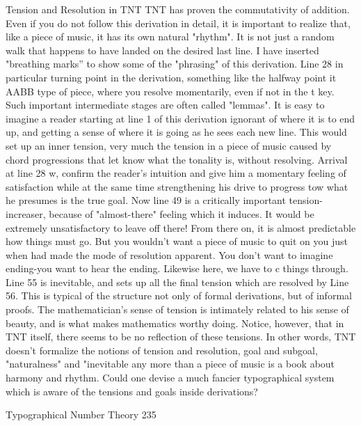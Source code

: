                           Tension and Resolution in TNT
TNT has proven the commutativity of addition. Even if you do not follow this derivation
in detail, it is important to realize that, like a piece of music, it has its own natural
"rhythm". It is not just a random walk that happens to have landed on the desired last
line. I have inserted "breathing marks” to show some of the "phrasing" of this derivation.
Line 28 in particular turning point in the derivation, something like the halfway point it
AABB type of piece, where you resolve momentarily, even if not in the t key. Such
important intermediate stages are often called "lemmas".
         It is easy to imagine a reader starting at line 1 of this derivation ignorant of where
it is to end up, and getting a sense of where it is going as he sees each new line. This
would set up an inner tension, very much the tension in a piece of music caused by chord
progressions that let know what the tonality is, without resolving. Arrival at line 28 w,
confirm the reader's intuition and give him a momentary feeling of satisfaction while at
the same time strengthening his drive to progress tow what he presumes is the true goal.
         Now line 49 is a critically important tension-increaser, because of "almost-there"
feeling which it induces. It would be extremely unsatisfactory to leave off there! From
there on, it is almost predictable how things must go. But you wouldn't want a piece of
music to quit on you just when had made the mode of resolution apparent. You don't
want to imagine ending-you want to hear the ending. Likewise here, we have to c things
through. Line 55 is inevitable, and sets up all the final tension which are resolved by Line
56.
         This is typical of the structure not only of formal derivations, but of informal
proofs. The mathematician's sense of tension is intimately related to his sense of beauty,
and is what makes mathematics worthy doing. Notice, however, that in TNT itself, there
seems to be no reflection of these tensions. In other words, TNT doesn't formalize the
notions of tension and resolution, goal and subgoal, "naturalness" and "inevitable any
more than a piece of music is a book about harmony and rhythm. Could one devise a
much fancier typographical system which is aware of the tensions and goals inside
derivations?




Typographical Number Theory                                                                 235

